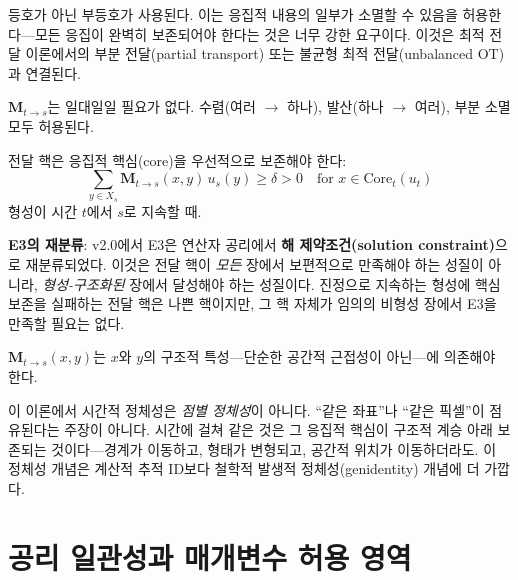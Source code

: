 등호가 아닌 부등호가 사용된다. 이는 응집적 내용의 일부가 소멸할 수 있음을 허용한다---모든 응집이 완벽히 보존되어야 한다는 것은 너무 강한 요구이다. 이것은 최적 전달 이론에서의 부분 전달(partial transport) 또는 불균형 최적 전달(unbalanced OT)과 연결된다.

\begin{axiom}
$\mathbf{M}_{t \to s}$는 일대일일 필요가 없다. 수렴(여러 $\to$ 하나), 발산(하나 $\to$ 여러), 부분 소멸 모두 허용된다.
\end{axiom}

\begin{axiom}[E3: 핵심 계승 (해 제약조건)]
전달 핵은 응집적 핵심(core)을 우선적으로 보존해야 한다:
\begin{equation}
    \sum_{y \in X_s} \mathbf{M}_{t \to s}(x,y)\, u_s(y) \geq \delta > 0 \quad \text{for } x \in \mathrm{Core}_t(u_t)
\end{equation}
형성이 시간 $t$에서 $s$로 지속할 때.
\end{axiom}

\textbf{E3의 재분류}: v2.0에서 E3은 연산자 공리에서 \textbf{해 제약조건(solution constraint)}으로 재분류되었다. 이것은 전달 핵이 \emph{모든} 장에서 보편적으로 만족해야 하는 성질이 아니라, \emph{형성-구조화된} 장에서 달성해야 하는 성질이다. 진정으로 지속하는 형성에 핵심 보존을 실패하는 전달 핵은 나쁜 핵이지만, 그 핵 자체가 임의의 비형성 장에서 E3을 만족할 필요는 없다.

\begin{axiom}
$\mathbf{M}_{t \to s}(x,y)$는 $x$와 $y$의 구조적 특성---단순한 공간적 근접성이 아닌---에 의존해야 한다.
\end{axiom}

\begin{tcolorbox}[colback=orange!5, colframe=orange!50!black, title=시간적 정체성에 대한 해석적 주석]
이 이론에서 시간적 정체성은 \emph{점별 정체성}이 아니다. ``같은 좌표''나 ``같은 픽셀''이 점유된다는 주장이 아니다. 시간에 걸쳐 같은 것은 그 응집적 핵심이 구조적 계승 아래 보존되는 것이다---경계가 이동하고, 형태가 변형되고, 공간적 위치가 이동하더라도. 이 정체성 개념은 계산적 추적 ID보다 철학적 발생적 정체성(genidentity) 개념에 더 가깝다.
\end{tcolorbox}


\section{공리 일관성과 매개변수 허용 영역}
\label{sec:axiom-consistency}

